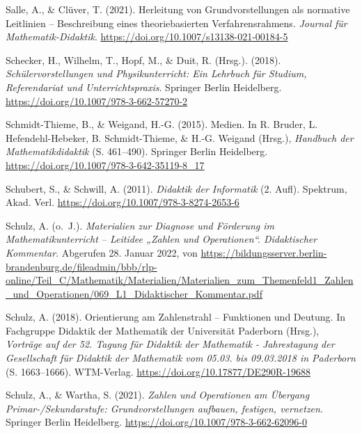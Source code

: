 \documentclass[
]{scrbook}
\newlength{\cslhangindent}
\newlength{\cslentryspacingunit} %
\newenvironment{CSLReferences}[2] %
 {%
  \setlength{\parindent}{0pt}
  \ifodd #1
  \let\oldpar\par
  \def\par{\hangindent=\cslhangindent\oldpar}
  \fi
  \setlength{\parskip}{#2\cslentryspacingunit}
 }%
 {}
\theoremstyle{definition}
\theoremstyle{definition}
\theoremstyle{definition}
\theoremstyle{definition}
\theoremstyle{remark}
\begin{document}
\begin{CSLReferences}{1}{0}
\leavevmode{}%
Salle, A., \& Clüver, T. (2021). Herleitung von {Grundvorstellungen} als normative {Leitlinien} -- {Beschreibung} eines theoriebasierten {Verfahrensrahmens}. \emph{Journal für Mathematik-Didaktik}. \url{https://doi.org/10.1007/s13138-021-00184-5}

\leavevmode{}%
Schecker, H., Wilhelm, T., Hopf, M., \& Duit, R. (Hrsg.). (2018). \emph{Schülervorstellungen und {Physikunterricht}: {Ein} {Lehrbuch} für {Studium}, {Referendariat} und {Unterrichtspraxis}}. Springer Berlin Heidelberg. \url{https://doi.org/10.1007/978-3-662-57270-2}

\leavevmode{}%
Schmidt-Thieme, B., \& Weigand, H.-G. (2015). Medien. In R. Bruder, L. Hefendehl-Hebeker, B. Schmidt-Thieme, \& H.-G. Weigand (Hrsg.), \emph{Handbuch der {Mathematikdidaktik}} (S. 461--490). Springer Berlin Heidelberg. \url{https://doi.org/10.1007/978-3-642-35119-8_17}

\leavevmode{}%
Schubert, S., \& Schwill, A. (2011). \emph{Didaktik der {Informatik}} (2. Aufl). Spektrum, Akad. Verl. \url{https://doi.org/10.1007/978-3-8274-2653-6}

\leavevmode{}%
Schulz, A. (o.~J.). \emph{Materialien zur {Diagnose} und {Förderung} im {Mathematikunterricht} -- {Leitidee} „{Zahlen} und {Operationen}``. {Didaktischer} {Kommentar}}. Abgerufen 28. Januar 2022, von \url{https://bildungsserver.berlin-brandenburg.de/fileadmin/bbb/rlp-online/Teil_C/Mathematik/Materialien/Materialien_zum_Themenfeld1_Zahlen_und_Operationen/069_L1_Didaktischer_Kommentar.pdf}

\leavevmode{}%
Schulz, A. (2018). Orientierung am {Zahlenstrahl} -- {Funktionen} und {Deutung}. In Fachgruppe Didaktik der Mathematik der Universität Paderborn (Hrsg.), \emph{Vorträge auf der 52. Tagung für Didaktik der Mathematik - Jahrestagung der Gesellschaft für Didaktik der Mathematik vom 05.03. bis 09.03.2018 in Paderborn} (S. 1663--1666). WTM-Verlag. \url{https://doi.org/10.17877/DE290R-19688}

\leavevmode{}%
Schulz, A., \& Wartha, S. (2021). \emph{Zahlen und {Operationen} am Übergang {Primar}-/{Sekundarstufe}: {Grundvorstellungen} aufbauen, festigen, vernetzen}. Springer Berlin Heidelberg. \url{https://doi.org/10.1007/978-3-662-62096-0}


\end{CSLReferences}
\end{document}
